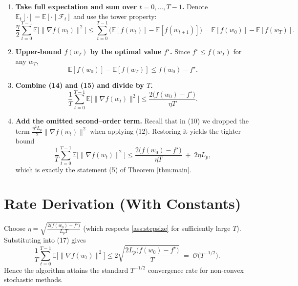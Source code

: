 \documentclass{article}
\begin{document}
\begin{enumerate}[label=[Step \arabic*], leftmargin=*]
\item \textbf{Take full expectation and sum over $t=0,\dots ,T-1$.}  
Denote $\mathbb{E}_t[\cdot]=\mathbb{E}[\cdot\mid\mathcal{F}_t]$ and use the tower property:
\[
\frac{\eta}{2}\sum_{t=0}^{T-1}\mathbb{E}\!\bigl[\|\nabla f(w_t)\|^{2}\bigr]
\le
\sum_{t=0}^{T-1}
\bigl(\mathbb{E}[f(w_t)]-\mathbb{E}[f(w_{t+1})]\bigr)
= \mathbb{E}[f(w_0)]-\mathbb{E}[f(w_T)].
\tag{14}
\]

\item \textbf{Upper‑bound $f(w_T)$ by the optimal value $f^{\star}$.}  
Since $f^{\star}\le f(w_T)$ for any $w_T$,
\[
\mathbb{E}[f(w_0)]-\mathbb{E}[f(w_T)]
\le f(w_0)-f^{\star}.
\tag{15}
\]

\item \textbf{Combine (14) and (15) and divide by $T$.}  
\[
\frac{1}{T}\sum_{t=0}^{T-1}
\mathbb{E}\!\bigl[\|\nabla f(w_t)\|^{2}\bigr]
\le
\frac{2\bigl(f(w_0)-f^{\star}\bigr)}{\eta T}.
\tag{16}
\]

\item \textbf{Add the omitted second–order term.}  
Recall that in (10) we dropped the term $\frac{\eta^{2}L_{p}}{2}\|\nabla f(w_t)\|^{2}$ when applying (12). Restoring it yields the tighter bound
\[
\frac{1}{T}\sum_{t=0}^{T-1}
\mathbb{E}\!\bigl[\|\nabla f(w_t)\|^{2}\bigr]
\le
\frac{2\bigl(f(w_0)-f^{\star}\bigr)}{\eta T}
\;+\;
2\eta L_{p},
\tag{17}
\]
which is exactly the statement (5) of Theorem \ref{thm:main}.
\end{enumerate}

\section*{Rate Derivation (With Constants)}
Choose $\eta = \sqrt{\frac{2\bigl(f(w_0)-f^{\star}\bigr)}{L_{p}T}}$ (which respects \eqref{ass:stepsize} for sufficiently large $T$). Substituting into (17) gives
\[
\frac{1}{T}\sum_{t=0}^{T-1}
\mathbb{E}\!\bigl[\|\nabla f(w_t)\|^{2}\bigr]
\le
2\sqrt{\frac{2L_{p}\bigl(f(w_0)-f^{\star}\bigr)}{T}}
\;=\;
\mathcal{O}\!\bigl(T^{-1/2}\bigr).
\]
Hence the algorithm attains the standard $T^{-1/2}$ convergence rate for non‑convex stochastic methods.
\end{document}
